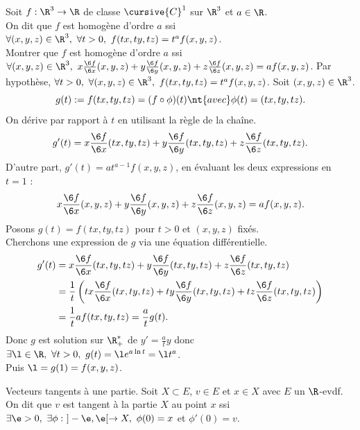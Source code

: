 \documentclass[11pt]{article}
\begin{document}
\begin{exercice}{}{}
    Soit $f:\R^3\to\R$ de classe $\cursive{C}^1$ sur $\R^3$ et $a\in\R$.\\
    On dit que $f$ est homogène d'ordre $a$ ssi $\forall (x,y,z)\in\R^3, ~ \forall t > 0, ~ f(tx,ty,tz)=t^af(x,y,z)$.\\
    Montrer que $f$ est homogène d'ordre $a$ ssi $\forall (x,y,z)\in\R^3, ~ x\frac{\6 f}{\6 x}(x,y,z)+y\frac{\6 f}{\6 y}(x,y,z)+z\frac{\6 f}{\6 z}(x,y,z)=af(x,y,z)$.
    \tcblower
    \boxed{\ra} Par hypothèse, $\forall t > 0, ~ \forall (x,y,z)\in\R^3, ~ f(tx,ty,tz)=t^af(x,y,z)$. Soit $(x,y,z)\in\R^3$.
    \begin{equation*}
        g(t) := f(tx,ty,tz) = (f\circ\phi)(t) \nt{ avec } \phi(t)=(tx,ty,tz).
    \end{equation*}
    On dérive par rapport à $t$ en utilisant la règle de la chaîne.
    \begin{equation*}
        g'(t) = x \frac{\6 f}{\6 x}(tx,ty,tz) + y\frac{\6 f}{\6 y}(tx,ty,tz) + z\frac{\6 f}{\6 z}(tx,ty,tz).
    \end{equation*}
    D'autre part, $g'(t)=at^{a-1}f(x,y,z)$, en évaluant les deux expressions en $t=1$ :
    \begin{equation*}
        x\frac{\6 f}{\6 x}(x,y,z) + y\frac{\6 f}{\6 y}(x,y,z) + z\frac{\6 f}{\6 z}(x,y,z) = af(x,y,z).
    \end{equation*}
    \boxed{\la} Posons $g(t)=f(tx,ty,tz)$ pour $t>0$ et $(x,y,z)$ fixés.\\
    Cherchons une expression de $g$ via une équation différentielle.
    \begin{align*}
        g'(t) &= x\frac{\6 f}{\6 x}(tx, ty,tz) + y\frac{\6 f}{\6 y}(tx,ty,tz) + z\frac{\6 f}{\6 z}(tx,ty,tz)\\
        &=\frac{1}{t}\left( tx\frac{\6 f}{\6 x}(tx,ty,tz) + ty \frac{\6 f}{\6 y}(tx,ty,tz) + tz\frac{\6 f}{\6 z}(tx,ty,tz) \right)\\
        &= \frac{1}{t}af(tx,ty,tz) = \frac{a}{t}g(t).
    \end{align*}
    Donc $g$ est solution sur $\R_+^*$ de $y'=\frac{a}{t}y$ donc $\exists \l \in \R, ~ \forall t > 0, ~ g(t)=\l e^{a\ln t}=\l t^a$.\\
    Puis $\l=g(1)=f(x,y,z)$.
\end{exercice}

\begin{defi}{Vecteurs tangents à une partie.}{}
    Soit $X\subset E$, $v\in E$ et $x\in X$ avec $E$ un $\R$-evdf.\\
    On dit que $v$ est tangent à la partie $X$ au point $x$ ssi $\exists \e>0, ~ \exists\phi:~]-\e,\e[\to X, ~ \phi(0)=x$ et $\phi'(0)=v$.
\end{defi}
\end{document}
